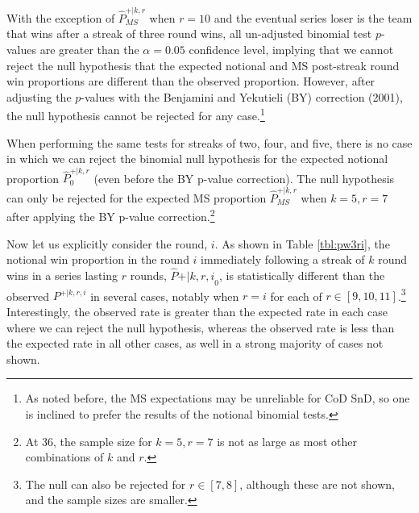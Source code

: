 \documentclass{article}
\begin{document}
With the exception of \(\hat{P}^{+|k,r}_{MS}\) when \(r = 10\) and the
eventual series loser is the team that wins after a streak of three
round wins, all un-adjusted binomial test \(p\)-values are greater than
the \(\alpha = 0.05\) confidence level, implying that we cannot reject
the null hypothesis that the expected notional and MS post-streak round
win proportions are different than the observed proportion. However,
after adjusting the \(p\)-values with the Benjamini and Yekutieli (BY)
correction (2001), the null hypothesis cannot be rejected for any
case.\footnote{As noted before, the MS expectations may be unreliable
  for CoD SnD, so one is inclined to prefer the results of the notional
  binomial tests.}

When performing the same tests for streaks of two, four, and five, there
is no case in which we can reject the binomial null hypothesis for the
expected notional proportion \(\hat{P}^{+|k,r}_0\) (even before the BY
p-value correction). The null hypothesis can only be rejected for the
expected MS proportion \(\hat{P}^{+|k,r}_{MS}\) when \(k = 5, r = 7\)
after applying the BY p-value correction.\footnote{At 36, the sample
  size for \(k = 5, r = 7\) is not as large as most other combinations
  of \(k\) and \(r\).}

Now let us explicitly consider the round, \(i\). As shown in Table
\ref{tbl:pw3ri}, the notional win proportion in the round \(i\)
immediately following a streak of \(k\) round wins in a series lasting
\(r\) rounds, \(\hat{P}{+|k,r,i}_0\), is statistically different than
the observed \(P^{+|k,r,i}\) in several cases, notably when \(r = i\)
for each of \(r \in [9, 10, 11]\).\footnote{The null can also be
  rejected for \(r \in [7, 8]\), although these are not shown, and the
  sample sizes are smaller.} Interestingly, the observed rate is greater
than the expected rate in each case where we can reject the null
hypothesis, whereas the observed rate is less than the expected rate in
all other cases, as well in a strong majority of cases not shown.
\end{document}
